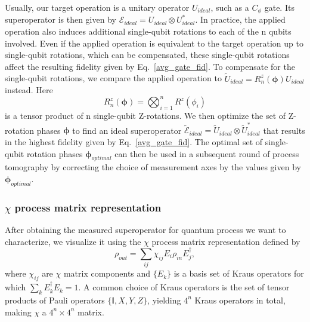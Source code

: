 \documentclass[12pt]{article}
\begin{document}
Usually, our target operation is a unitary operator $U_{ideal}$, such as a $C_{\phi}$ gate. Its superoperator is then given by $\mathcal{E}_{ideal} = U_{ideal} \otimes U_{ideal}^*$. In practice, the applied operation also induces additional single-qubit rotations to each of the n qubits involved. Even if the applied operation is equivalent to the target operation up to single-qubit rotations, which can be compensated, these single-qubit rotations affect the resulting fidelity given by Eq.~\ref{avg_gate_fid}. To compensate for the single-qubit rotations, we compare the applied operation to $\tilde{U}_{ideal} = R^z_{n}(\boldsymbol{\phi}) U_{ideal}$ instead. Here
\begin{equation}
R^z_{n}(\boldsymbol{\phi}) = \bigotimes_{i=1}^{n} R^z(\phi_i)
\end{equation}
is a tensor product of n single-qubit Z-rotations. We then optimize the set of Z-rotation phases $\boldsymbol{\phi}$ to find an ideal superoperator $\tilde{\mathcal{E}}_{ideal} = \tilde{U}_{ideal}^{} \otimes \tilde{U}_{ideal}^*$ that results in the highest fidelity given by Eq.~\ref{avg_gate_fid}. The optimal set of single-qubit rotation phases $\boldsymbol{\phi}_{optimal}$ can then be used in a subsequent round of process tomography by correcting the choice of measurement axes by the values given by $\boldsymbol{\phi}_{optimal}$.


\subsubsection{$\chi$ process matrix representation}

After obtaining the measured superoperator for quantum process we want to characterize, we visualize it using the $\chi$ process matrix representation defined by
\begin{equation}
\label{chi_formula}
\rho_{out} = \sum_{ij} \chi_{ij} E_i \rho_{in} E_j^{\dagger},
\end{equation}
where $\chi_{ij}$ are $\chi$ matrix components and $\{ E_k \}$ is a basis set of Kraus operators for which $\sum_k E_k^{\dagger} E_k = 1$. A common choice of Kraus operators is the set of tensor products of Pauli operators $\{\mathbb{I}, X, Y, Z\}$, yielding $4^n$ Kraus operators in total, making $\chi$ a $4^n \times 4^n$ matrix.
\end{document}
